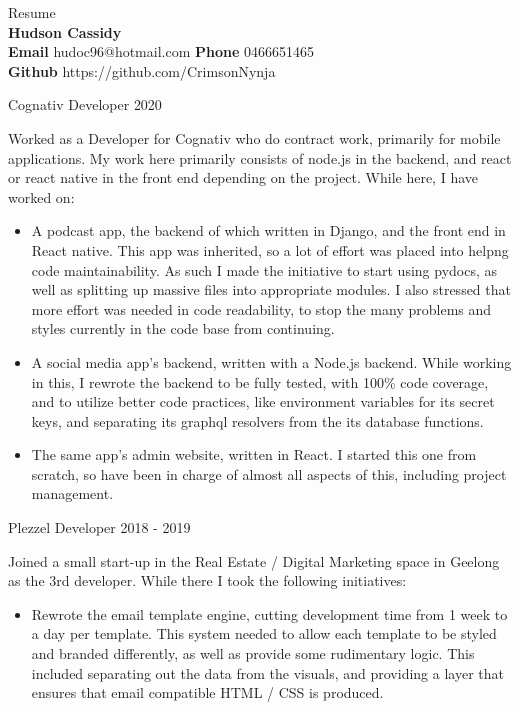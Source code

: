 \documentclass[8pt]{developercv}
\begin{document}
	\begin{minipage}[a]{1.0\textwidth}
		\begin{center}	%
			{\HUGE Resume}\\
			\textbf {Hudson Cassidy} \\
			\textbf {Email} hudoc96@hotmail.com
			\textbf {Phone} 0466651465 \\
			\textbf {Github} https://github.com/CrimsonNynja \\
		\end{center}
	\end{minipage}
	\begin{minipage}[t]{0.7\textwidth}
		\begin{entrylist}	%
			\entry
				{Cognativ}
				{Developer}
				{2020}
				{Worked as a Developer for Cognativ who do contract work, primarily for mobile applications. My work here primarily consists of node.js in the backend, and react or react native in the front end depending on the project.
				While here, I have worked on:
				\begin{itemize}
					\item A podcast app, the backend of which written in Django, and the front end in React native. This app was inherited, so a lot of effort was placed into helpng code maintainability. As such I made the initiative to start using pydocs, as well as splitting up massive files into appropriate modules. I also stressed that more effort was needed in code readability, to stop the many problems and styles currently in the code base from continuing.
					\item A social media app's backend, written with a Node.js backend. While working in this, I rewrote the backend to be fully tested, with 100\% code coverage, and to utilize better code practices, like environment variables for its secret keys, and separating its graphql resolvers from the its database functions.
					\item The same app's admin website, written in React. I started this one from scratch, so have been in charge of almost all aspects of this, including project management.
				\end{itemize}
				}
			\entry
				{Plezzel}
				{Developer}
				{2018 - 2019}
				{Joined a small start-up in the Real Estate / Digital Marketing space in Geelong as the 3rd developer. While there I took the following initiatives:
				\begin{itemize}
					\item Rewrote the email template engine, cutting development time from 1 week to a day per template. This system needed to allow each template to be styled and branded differently, as well as provide some rudimentary logic. This included separating out the data from the visuals, and providing a layer that ensures that email compatible HTML / CSS is produced.

\end{itemize}}
\end{entrylist}
\end{minipage}
\end{document}
